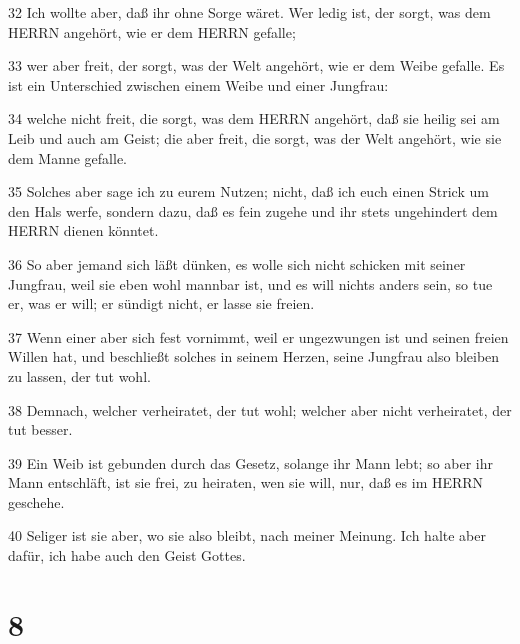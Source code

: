 \par 32 Ich wollte aber, daß ihr ohne Sorge wäret. Wer ledig ist, der sorgt, was dem HERRN angehört, wie er dem HERRN gefalle;
\par 33 wer aber freit, der sorgt, was der Welt angehört, wie er dem Weibe gefalle. Es ist ein Unterschied zwischen einem Weibe und einer Jungfrau:
\par 34 welche nicht freit, die sorgt, was dem HERRN angehört, daß sie heilig sei am Leib und auch am Geist; die aber freit, die sorgt, was der Welt angehört, wie sie dem Manne gefalle.
\par 35 Solches aber sage ich zu eurem Nutzen; nicht, daß ich euch einen Strick um den Hals werfe, sondern dazu, daß es fein zugehe und ihr stets ungehindert dem HERRN dienen könntet.
\par 36 So aber jemand sich läßt dünken, es wolle sich nicht schicken mit seiner Jungfrau, weil sie eben wohl mannbar ist, und es will nichts anders sein, so tue er, was er will; er sündigt nicht, er lasse sie freien.
\par 37 Wenn einer aber sich fest vornimmt, weil er ungezwungen ist und seinen freien Willen hat, und beschließt solches in seinem Herzen, seine Jungfrau also bleiben zu lassen, der tut wohl.
\par 38 Demnach, welcher verheiratet, der tut wohl; welcher aber nicht verheiratet, der tut besser.
\par 39 Ein Weib ist gebunden durch das Gesetz, solange ihr Mann lebt; so aber ihr Mann entschläft, ist sie frei, zu heiraten, wen sie will, nur, daß es im HERRN geschehe.
\par 40 Seliger ist sie aber, wo sie also bleibt, nach meiner Meinung. Ich halte aber dafür, ich habe auch den Geist Gottes.

\chapter{8}

